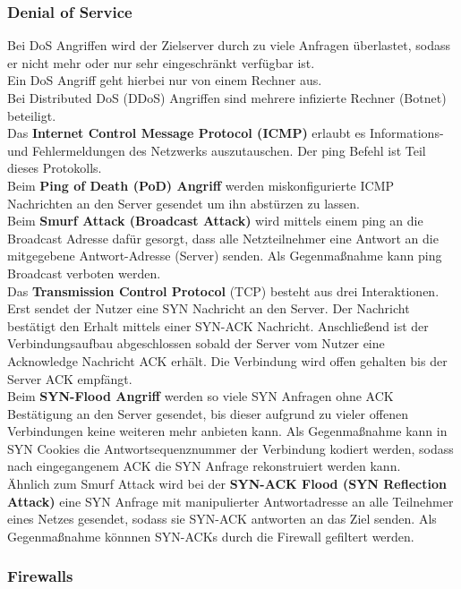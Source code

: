 \documentclass[a4paper,12pt,leqno]{article}
\begin{document}
\subsubsection{Denial of Service}

Bei DoS Angriffen wird der Zielserver durch zu viele Anfragen überlastet, sodass er nicht mehr oder nur sehr eingeschränkt verfügbar ist.\\
Ein DoS Angriff geht hierbei nur von einem Rechner aus.\\
Bei Distributed DoS (DDoS) Angriffen sind mehrere infizierte Rechner (Botnet) beteiligt.\\

Das \textbf{Internet Control Message Protocol (ICMP)} erlaubt es Informations- und Fehlermeldungen des Netzwerks auszutauschen. Der ping Befehl ist Teil dieses Protokolls.\\
Beim \textbf{Ping of Death (PoD) Angriff} werden miskonfigurierte ICMP Nachrichten an den Server gesendet um ihn abstürzen zu lassen.\\
Beim \textbf{Smurf Attack (Broadcast Attack)} wird mittels einem ping an die Broadcast Adresse dafür gesorgt, dass alle Netzteilnehmer eine Antwort an die mitgegebene Antwort-Adresse (Server) senden. Als Gegenmaßnahme kann ping Broadcast verboten werden.\\

Das \textbf{Transmission Control Protocol} (TCP) besteht aus drei Interaktionen. Erst sendet der Nutzer eine SYN Nachricht an den Server. Der Nachricht bestätigt den Erhalt mittels einer SYN-ACK Nachricht. Anschließend ist der Verbindungsaufbau abgeschlossen sobald der Server vom Nutzer eine Acknowledge Nachricht ACK erhält.
Die Verbindung wird offen gehalten bis der Server ACK empfängt.\\
Beim \textbf{SYN-Flood Angriff} werden so viele SYN Anfragen ohne ACK Bestätigung an den Server gesendet, bis dieser aufgrund zu vieler offenen Verbindungen keine weiteren mehr anbieten kann. Als Gegenmaßnahme kann in SYN Cookies die Antwortsequenznummer der Verbindung kodiert werden, sodass nach eingegangenem ACK die SYN Anfrage rekonstruiert werden kann.\\
Ähnlich zum Smurf Attack wird bei der \textbf{SYN-ACK Flood (SYN Reflection Attack)} eine SYN Anfrage mit manipulierter Antwortadresse an alle Teilnehmer eines Netzes gesendet, sodass sie SYN-ACK antworten an das Ziel senden. Als Gegenmaßnahme könnnen SYN-ACKs durch die Firewall gefiltert werden.

\subsubsection{Firewalls} 
\end{document}
